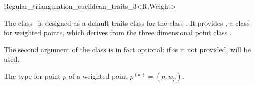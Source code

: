 

\begin{ccRefClass}{Regular_triangulation_euclidean_traits_3<R,Weight>}  %


\ccDefinition
  
The class \ccRefName\ is designed as a default traits class for the
class . 
It provides , a class for weighted points, which derives
from the three dimensional point class .

The second argument  of the class
 is in fact
optional: if is it not provided,  will be used.


\ccIsModel
{}


\ccTypes
{}

{The type for point $p$ of a weighted point ${p}^{(w)}=(p,w_p)$.}
\ccGlue
{}



\end{ccRefClass}


